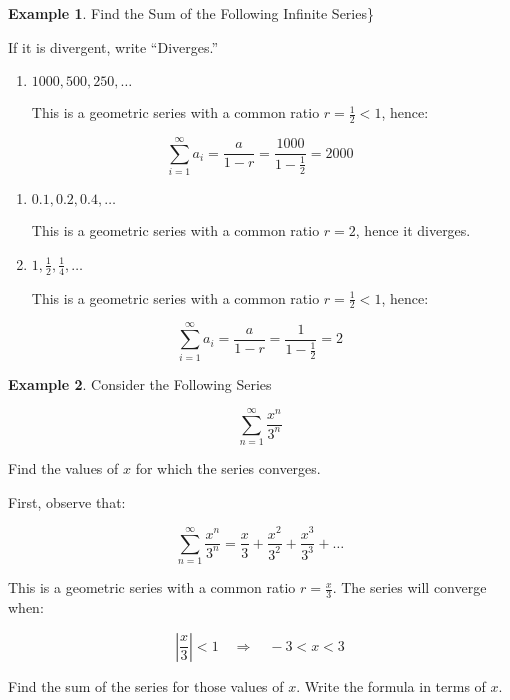 \documentclass[
]{book}
\theoremstyle{definition}
\theoremstyle{definition}
\newtheorem{example}{Example}[chapter]
\theoremstyle{definition}
\theoremstyle{definition}
\theoremstyle{remark}
\begin{document}
\begin{example}
\protect\hypertarget{exm:unnamed-chunk-3}{}\label{exm:unnamed-chunk-3}Find the Sum of the Following Infinite Series\}

If it is divergent, write ``Diverges.''

\begin{enumerate}
\def\labelenumi{\alph{enumi}.}
\item
  \(1000, 500, 250, \dots\)

  This is a geometric series with a common ratio \(r = \frac{1}{2} < 1\), hence:
\end{enumerate}

\[
    \sum_{i=1}^\infty a_i = \frac{a}{1-r} = \frac{1000}{1 - \frac{1}{2}} = 2000
    \]

\begin{enumerate}
\def\labelenumi{\alph{enumi}.}
\setcounter{enumi}{1}
\item
  \(0.1, 0.2, 0.4, \dots\)

  This is a geometric series with a common ratio \(r = 2\), hence it diverges.
\item
  \(1, \frac{1}{2}, \frac{1}{4}, \dots\)

  This is a geometric series with a common ratio \(r = \frac{1}{2} < 1\), hence:
\end{enumerate}

\[
    \sum_{i=1}^\infty a_i = \frac{a}{1-r} = \frac{1}{1 - \frac{1}{2}} = 2
    \]
\end{example}

\begin{example}
\protect\hypertarget{exm:unnamed-chunk-4}{}\label{exm:unnamed-chunk-4}Consider the Following Series

\[
\sum_{n=1}^\infty \frac{x^n}{3^n}
\]
\end{example}

Find the values of \(x\) for which the series converges.

First, observe that:

\[
    \sum_{n=1}^\infty \frac{x^n}{3^n} = \frac{x}{3} + \frac{x^2}{3^2} + \frac{x^3}{3^3} + \dots
    \]

This is a geometric series with a common ratio \(r = \frac{x}{3}\). The series will converge when:

\[
    \left|\frac{x}{3}\right| < 1 \quad \Rightarrow \quad -3 < x < 3
    \]

Find the sum of the series for those values of \(x\). Write the formula in terms of \(x\).
\end{document}
